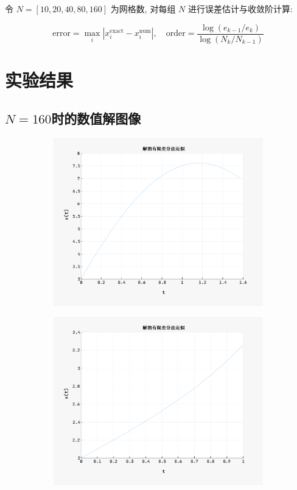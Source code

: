 \documentclass[11pt]{article}
\begin{document}
令 $N = [10, 20, 40, 80, 160]$ 为网格数, 对每组 $N$ 进行误差估计与收敛阶计算:

\begin{equation*}
\text{error} = \max_i |x_i^{\text{exact}} - x_i^{\text{num}}|,\quad
\text{order} = \frac{\log(e_{k-1}/e_k)}{\log(N_k/N_{k-1})}
\end{equation*}

\section{实验结果}
\subsection{\texorpdfstring{$N=160$时的数值解图像}{N=160时的数值解图像}}
\begin{figure}[ht]
	\centering
	\begin{subfigure}[b]{0.45\textwidth}
		\includegraphics[width=\linewidth]{figure/f1.png}
	\end{subfigure}
	\hspace{0.5cm}
	\begin{subfigure}[b]{0.45\textwidth}
		\includegraphics[width=\linewidth]{figure/f2.png}

\end{subfigure}
\end{figure}
\end{document}
